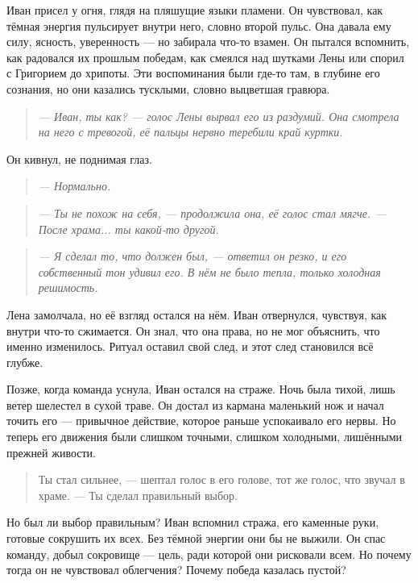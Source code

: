 \documentclass[12pt,a4paper]{book}
\newenvironment{dialogue}{\begin{quote}\itshape}{\end{quote}}
\begin{document}
Иван присел у огня, глядя на пляшущие языки пламени. Он чувствовал, как тёмная энергия пульсирует внутри него, словно второй пульс. Она давала ему силу, ясность, уверенность --- но забирала что-то взамен. Он пытался вспомнить, как радовался их прошлым победам, как смеялся над шутками Лены или спорил с Григорием до хрипоты. Эти воспоминания были где-то там, в глубине его сознания, но они казались тусклыми, словно выцветшая гравюра.

\begin{dialogue}
--- Иван, ты как? --- голос Лены вырвал его из раздумий. Она смотрела на него с тревогой, её пальцы нервно теребили край куртки.
\end{dialogue}

Он кивнул, не поднимая глаз.

\begin{dialogue}
--- Нормально.
\end{dialogue}

\begin{dialogue}
--- Ты не похож на себя, --- продолжила она, её голос стал мягче. --- После храма... ты какой-то другой.
\end{dialogue}

\begin{dialogue}
--- Я сделал то, что должен был, --- ответил он резко, и его собственный тон удивил его. В нём не было тепла, только холодная решимость.
\end{dialogue}

Лена замолчала, но её взгляд остался на нём. Иван отвернулся, чувствуя, как внутри что-то сжимается. Он знал, что она права, но не мог объяснить, что именно изменилось. Ритуал оставил свой след, и этот след становился всё глубже.

Позже, когда команда уснула, Иван остался на страже. Ночь была тихой, лишь ветер шелестел в сухой траве. Он достал из кармана маленький нож и начал точить его --- привычное действие, которое раньше успокаивало его нервы. Но теперь его движения были слишком точными, слишком холодными, лишёнными прежней живости.

\begin{quote}
Ты стал сильнее, --- шептал голос в его голове, тот же голос, что звучал в храме. --- Ты сделал правильный выбор.
\end{quote}

Но был ли выбор правильным? Иван вспомнил стража, его каменные руки, готовые сокрушить их всех. Без тёмной энергии они бы не выжили. Он спас команду, добыл сокровище --- цель, ради которой они рисковали всем. Но почему тогда он не чувствовал облегчения? Почему победа казалась пустой?
\end{document}
